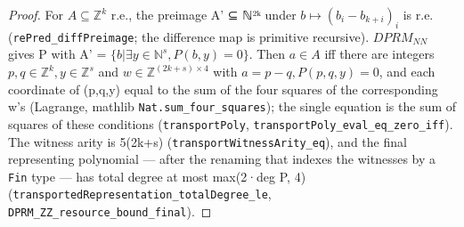 \begin{proof}
For $A ⊆ ℤ^{k}$ r.e., the preimage A' ⊆ ℕ²ᵏ under $b ↦ (b_{i} − b_{k+i})_{i}$ is r.e. (\texttt{rePred\_\allowbreak{}diffPreimage}; the difference map is primitive recursive). $DPRM_{NN}$ gives P with A' = $\{b | ∃ y ∈ ℕ^{s}, P(b,y) = 0\}$. Then $a ∈ A$ iff there are integers $p, q ∈ ℤ^{k}, y ∈ ℤ^{s}$ and $w ∈ ℤ^{(2k+s)×4}$ with $a = p − q, P(p,q,y) = 0$, and each coordinate of (p,q,y) equal to the sum of the four squares of the corresponding w's (Lagrange, mathlib \texttt{Nat.\allowbreak{}sum\_\allowbreak{}four\_\allowbreak{}squares}); the single equation is the sum of squares of these conditions (\texttt{transportPoly}, \texttt{transportPoly\_\allowbreak{}eval\_\allowbreak{}eq\_\allowbreak{}zero\_\allowbreak{}iff}). The witness arity is 5(2k+s) (\texttt{transportWitnessArity\_\allowbreak{}eq}), and the final representing polynomial — after the renaming that indexes the witnesses by a \texttt{Fin} type — has total degree at most max(2·deg P, 4) (\texttt{transportedRepresentation\_\allowbreak{}totalDegree\_\allowbreak{}le}, \texttt{DPRM\_\allowbreak{}ZZ\_\allowbreak{}resource\_\allowbreak{}bound\_\allowbreak{}final}).

\end{proof}


